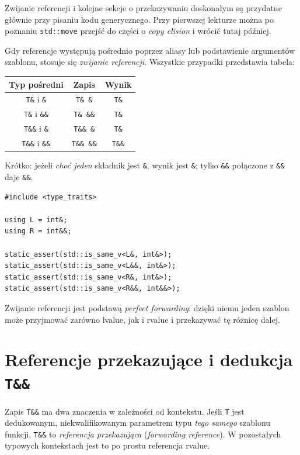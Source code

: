 Zwijanie referencji i kolejne sekcje o przekazywaniu doskonałym są
przydatne głównie przy pisaniu kodu generycznego. Przy pierwszej
lekturze można po poznaniu \texttt{std::move} przejść do części o
\emph{copy elision} i wrócić tutaj później.

Gdy referencje występują pośrednio poprzez aliasy lub
podstawienie argumentów szablonu, stosuje się \emph{zwijanie
referencji}. Wszystkie przypadki przedstawia tabela:

\begin{center}
\begin{tabular}{|c|c|c|}
\hline
\textbf{Typ pośredni} & \textbf{Zapis} & \textbf{Wynik} \\
\hline
\texttt{T\&} i \texttt{\&} & \texttt{T\& \&} & \texttt{T\&} \\
\texttt{T\&} i \texttt{\&\&} & \texttt{T\& \&\&} & \texttt{T\&} \\
\texttt{T\&\&} i \texttt{\&} & \texttt{T\&\& \&} & \texttt{T\&} \\
\texttt{T\&\&} i \texttt{\&\&} & \texttt{T\&\& \&\&} & \texttt{T\&\&} \\
\hline
\end{tabular}
\end{center}

Krótko: jeżeli \emph{choć jeden} składnik jest \texttt{\&},
wynik jest \texttt{\&}; tylko \texttt{\&\&} połączone
z \texttt{\&\&} daje \texttt{\&\&}.

\begin{lstlisting}
#include <type_traits>

using L = int&;
using R = int&&;

static_assert(std::is_same_v<L&, int&>);
static_assert(std::is_same_v<L&&, int&>);
static_assert(std::is_same_v<R&, int&>);
static_assert(std::is_same_v<R&&, int&&>);
\end{lstlisting}

Zwijanie referencji jest podstawą \emph{perfect forwarding}:
dzięki niemu jeden szablon może przyjmować zarówno lvalue,
jak i rvalue i przekazywać tę różnicę dalej.

\section{Referencje przekazujące i dedukcja \texttt{T\&\&}}
\label{sec:move-forwarding-ref}

Zapis \texttt{T\&\&} ma dwa znaczenia w zależności od kontekstu.
Jeśli \texttt{T} jest dedukowanym, niekwalifikowanym parametrem
typu \emph{tego samego} szablonu funkcji, \texttt{T\&\&}
to \emph{referencja przekazująca} (\textit{forwarding reference}).
W pozostałych typowych kontekstach jest to po prostu
referencja rvalue.

